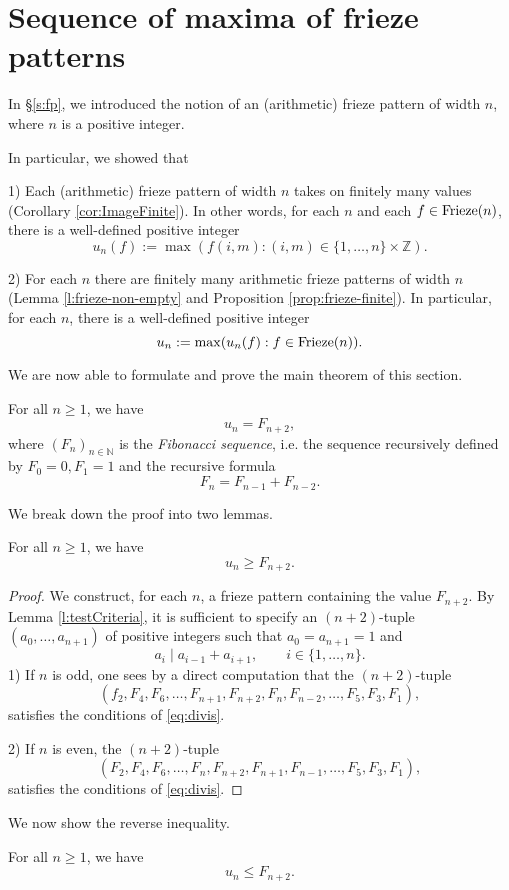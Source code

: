 \chapter{Sequence of maxima of frieze patterns}
In \S \ref{s:fp}, we introduced the notion of an (arithmetic) frieze pattern of width $n$, where $n$ is a positive integer.

In particular, we showed that 

1) Each (arithmetic) frieze pattern of width $n$ takes on finitely many values (Corollary \ref{cor:ImageFinite}). In 
other words, for each $n$ and each $f \in {\rm Frieze}(n)$, there is a well-defined positive integer
\[
    u_n(f) := \max ( f (i,m) : (i,m)  \in \{1,\ldots,n \}\times \mathbb{Z}).
\]

2) For each $n$ there are finitely many arithmetic frieze patterns of width $n$ (Lemma \ref{l:frieze-non-empty} and 
Proposition \ref{prop:frieze-finite}). In particular, for each $n$, there is a well-defined
positive integer 
\[
    u_n := \max (u_n(f) : f \in  {\rm Frieze}(n)).
\]

We are now able to formulate and prove the main theorem of this section.
\begin{theorem}
    \label{MainTheorem}
    For all $n \geq 1$, we have 
    \[
        u_n = F_{n+2},
    \]
    where $(F_{n})_{n \in \mathbb{N}}$ is the {\it Fibonacci sequence}, i.e. the sequence recursively defined by 
    $F_0 = 0, F_1 = 1$ and the recursive formula
    \[
        F_n = F_{n-1} + F_{n-2}.
    \]
\end{theorem}
We break down the proof into two lemmas. 

\begin{lemma}
    \label{l:unLB}
    For all $n \geq 1$, we have 
    \[
        u_n \geq F_{n+2}.
    \]
\end{lemma}
\begin{proof}
    We construct, for each $n$, a frieze pattern containing the value $F_{n+2}$. By Lemma \ref{l:testCriteria}, 
    it is sufficient to specify an $(n+2)$-tuple $(a_0, \ldots, a_{n+1})$ of positive integers such that $a_0 = a_{n+1} =1$ and 
    \begin{equation}\label{eq:divis}
        a_i \mid a_{i-1} + a_{i+1}, \qquad i \in \{1, \ldots, n\}.
    \end{equation}
    1) If $n$ is odd, one sees by a direct computation that the $(n+2)$-tuple 
    \[
        (f_2,F_4, F_6, \ldots, F_{n+1}, F_{n+2}, F_n, F_{n-2}, \ldots, F_5, F_3, F_1), 
    \]
    satisfies the conditions of \eqref{eq:divis}. 

    2) If $n$ is even, the $(n+2)$-tuple 
    \[
        (F_2, F_4, F_6, \ldots, F_n, F_{n+2}, F_{n+1}, F_{n-1}, \ldots, F_5, F_3,F_1),
    \]
    satisfies the conditions of \eqref{eq:divis}. 
\end{proof}

We now show the reverse inequality.
\begin{lemma}
    \label{l:unUB}
    For all $n \geq 1$, we have 
    \[
        u_n \leq F_{n+2}.
    \]
\end{lemma}